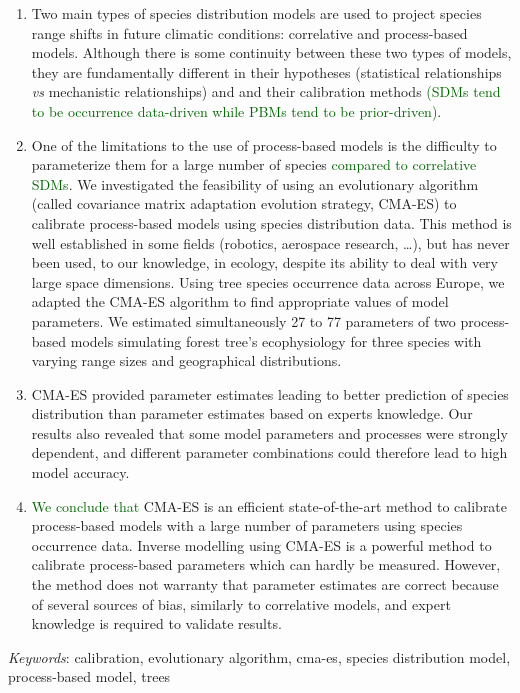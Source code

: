 \documentclass[11pt,]{article}
\renewenvironment{abstract}
 {{%
    \setlength{\leftmargin}{0mm}
    \setlength{\rightmargin}{\leftmargin}%
  }%
  \relax}
 {\endlist}
\begin{document}
\begin{abstract}

    \hbox{\vrule height .2pt width 39.14pc}

    \vskip 8.5pt %

\noindent \begin{enumerate}
\def\labelenumi{\arabic{enumi}.}
\item
  Two main types of species distribution models are used to project
  species range shifts in future climatic conditions: correlative and
  process-based models. Although there is some continuity between these
  two types of models, they are fundamentally different in their
  hypotheses (statistical relationships \emph{vs} mechanistic
  relationships) and and their calibration methods
  \textcolor{darkgreen}{(SDMs tend to be occurrence data-driven while PBMs tend to be prior-driven)}.
\item
  One of the limitations to the use of process-based models is the
  difficulty to parameterize them for a large number of species
  \textcolor{darkgreen}{compared to correlative SDMs}. We investigated
  the feasibility of using an evolutionary algorithm (called covariance
  matrix adaptation evolution strategy, CMA-ES) to calibrate
  process-based models using species distribution data. This method is
  well established in some fields (robotics, aerospace research,
  \ldots), but has never been used, to our knowledge, in ecology,
  despite its ability to deal with very large space dimensions. Using
  tree species occurrence data across Europe, we adapted the CMA-ES
  algorithm to find appropriate values of model parameters. We estimated
  simultaneously 27 to 77 parameters of two process-based models
  simulating forest tree's ecophysiology for three species with varying
  range sizes and geographical distributions.
\item
  CMA-ES provided parameter estimates leading to better prediction of
  species distribution than parameter estimates based on experts
  knowledge. Our results also revealed that some model parameters and
  processes were strongly dependent, and different parameter
  combinations could therefore lead to high model accuracy.
\item
  \textcolor{darkgreen}{We conclude that} CMA-ES is an efficient
  state-of-the-art method to calibrate process-based models with a large
  number of parameters using species occurrence data. Inverse modelling
  using CMA-ES is a powerful method to calibrate process-based
  parameters which can hardly be measured. However, the method does not
  warranty that parameter estimates are correct because of several
  sources of bias, similarly to correlative models, and expert knowledge
  is required to validate results.
\end{enumerate}


\vskip 8.5pt \noindent \emph{Keywords}: calibration, evolutionary
algorithm, cma-es, species distribution model, process-based model,
trees \par

    \hbox{\vrule height .2pt width 39.14pc}



\end{abstract}
\end{document}
